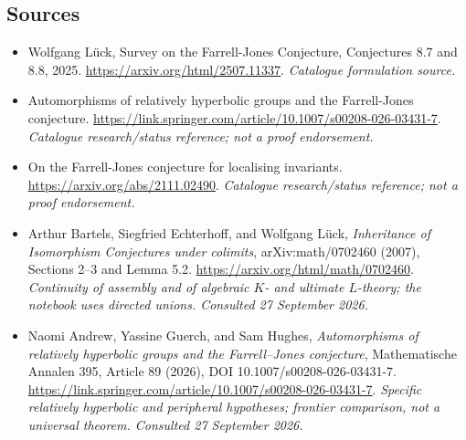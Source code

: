 \documentclass[11pt,a4paper]{article}
\numberwithin{equation}{section}
\begin{document}
\subsection{Sources}
\begin{itemize}\raggedright
\item[\textnormal{[S1]}]\hypertarget{source:68:1}{} Wolfgang Lück, Survey on the Farrell-Jones Conjecture, Conjectures 8.7 and 8.8, 2025.
\url{https://arxiv.org/html/2507.11337}.
{\small\textit{Catalogue formulation source.}}
\item[\textnormal{[S2]}]\hypertarget{source:68:2}{} Automorphisms of relatively hyperbolic groups and the Farrell-Jones conjecture.
\url{https://link.springer.com/article/10.1007/s00208-026-03431-7}.
{\small\textit{Catalogue research/status reference; not a proof endorsement.}}
\item[\textnormal{[S3]}]\hypertarget{source:68:3}{} On the Farrell-Jones conjecture for localising invariants.
\url{https://arxiv.org/abs/2111.02490}.
{\small\textit{Catalogue research/status reference; not a proof endorsement.}}

\item[\textnormal{[E1]}]\hypertarget{extra:68:1}{} Arthur Bartels, Siegfried Echterhoff, and Wolfgang Lück, \emph{Inheritance of Isomorphism Conjectures under colimits}, arXiv:math/0702460 (2007), Sections 2--3 and Lemma 5.2.
\url{https://arxiv.org/html/math/0702460}.
{\small\textit{Continuity of assembly and of algebraic $K$- and ultimate $L$-theory; the notebook uses directed unions. Consulted 27 September 2026.}}
\item[\textnormal{[E2]}]\hypertarget{extra:68:2}{} Naomi Andrew, Yassine Guerch, and Sam Hughes, \emph{Automorphisms of relatively hyperbolic groups and the Farrell--Jones conjecture}, Mathematische Annalen 395, Article 89 (2026), DOI 10.1007/s00208-026-03431-7.
\url{https://link.springer.com/article/10.1007/s00208-026-03431-7}.
{\small\textit{Specific relatively hyperbolic and peripheral hypotheses; frontier comparison, not a universal theorem. Consulted 27 September 2026.}}
\end{itemize}
\end{document}
